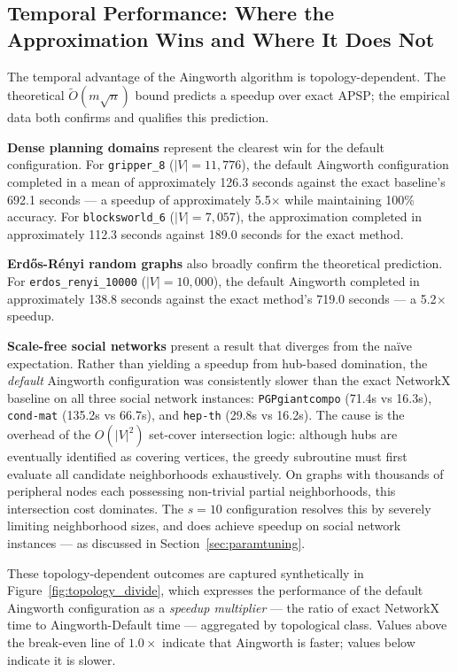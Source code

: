 \subsection{Temporal Performance: Where the Approximation Wins and Where It Does Not}

The temporal advantage of the Aingworth algorithm is topology-dependent. The theoretical $\tilde{O}(m\sqrt{n})$ bound predicts a speedup over exact APSP; the empirical data both confirms and qualifies this prediction.

\textbf{Dense planning domains} represent the clearest win for the default configuration. For \texttt{gripper\_8} ($|V| = 11{,}776$), the default Aingworth configuration completed in a mean of approximately 126.3 seconds against the exact baseline's 692.1 seconds --- a speedup of approximately 5.5$\times$ while maintaining 100\% accuracy. For \texttt{blocksworld\_6} ($|V| = 7{,}057$), the approximation completed in approximately 112.3 seconds against 189.0 seconds for the exact method.

\textbf{Erdős-Rényi random graphs} also broadly confirm the theoretical prediction. For \texttt{erdos\_renyi\_10000} ($|V| = 10{,}000$), the default Aingworth completed in approximately 138.8 seconds against the exact method's 719.0 seconds --- a 5.2$\times$ speedup.

\textbf{Scale-free social networks} present a result that diverges from the naïve expectation. Rather than yielding a speedup from hub-based domination, the \textit{default} Aingworth configuration was consistently slower than the exact NetworkX baseline on all three social network instances: \texttt{PGPgiantcompo} (71.4s vs 16.3s), \texttt{cond-mat} (135.2s vs 66.7s), and \texttt{hep-th} (29.8s vs 16.2s). The cause is the overhead of the $O(|V|^2)$ set-cover intersection logic: although hubs are eventually identified as covering vertices, the greedy subroutine must first evaluate all candidate neighborhoods exhaustively. On graphs with thousands of peripheral nodes each possessing non-trivial partial neighborhoods, this intersection cost dominates. The $s = 10$ configuration resolves this by severely limiting neighborhood sizes, and does achieve speedup on social network instances --- as discussed in Section~\ref{sec:paramtuning}.

These topology-dependent outcomes are captured synthetically in Figure~\ref{fig:topology_divide}, which expresses the performance of the default Aingworth configuration as a \textit{speedup multiplier} --- the ratio of exact NetworkX time to Aingworth-Default time --- aggregated by topological class. Values above the break-even line of $1.0\times$ indicate that Aingworth is faster; values below indicate it is slower.

